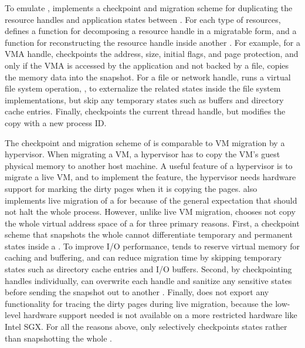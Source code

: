 To emulate , \thelibos{} implements
a checkpoint and migration scheme
for duplicating the resource handles and application states between \picoprocs{}.
For each type of resources, \thelibos{} defines a function for decomposing a resource handle in a migratable form,
and a function for reconstructing the resource handle inside another \picoproc{}.
For example,
for a VMA handle, \thelibos{} checkpoints the address, size, initial flags, and page protection,
and only if the VMA is accessed by the application and not backed by a file,
\thelibos{} copies the memory data into the snapshot.
For a file or network handle,
\thelibos{} runs a virtual file system operation,
,
to externalize the related states
inside the file system implementations,
but skip any temporary states such as buffers and directory cache entries.
Finally, \thelibos{} checkpoints the current thread handle, but modifies the copy with a new process ID.



The checkpoint and migration scheme of \thelibos{} is comparable to
VM migration by a hypervisor.
When migrating a VM, a hypervisor has to copy the VM's guest physical memory to another host machine.
A useful feature of a hypervisor is to migrate a live VM,
and to implement the feature, the hypervisor needs hardware support for marking the dirty pages when it is copying the pages.
\graphene{} also implements live migration of a \picoproc{} for 
because of the general expectation
that  should not halt the whole process.
However, unlike live VM migration, \graphene{} chooses not %
copy the whole virtual address space
of a \picoproc{}
for three primary reasons.
First, a checkpoint scheme that snapshots the whole \picoproc{}
cannot differentiate temporary and permanent states inside a \libos{}.
To improve I/O performance, \thelibos{} tends to reserve %
virtual memory for caching and buffering, and \thelibos{} can reduce migration time by skipping temporary states such as directory cache entries and I/O buffers.
Second, by checkpointing handles individually,
\thelibos{} can overwrite each handle and sanitize any sensitive states before sending the snapshot out to another \picoproc{}.
Finally, \thehostabi{} does not export any functionality for tracing
the dirty pages during live migration,
because the low-level hardware support needed
is not available on a more restricted hardware like Intel SGX.
For all the reasons above,
\thelibos{} only selectively checkpoints \libos{} states rather than snapshotting the whole \picoproc{}.


